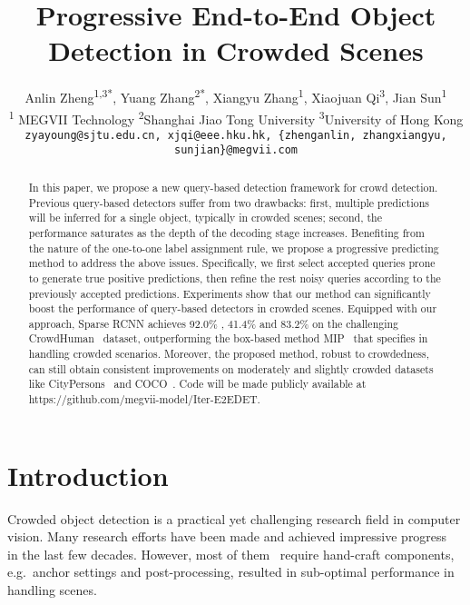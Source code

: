\documentclass[final]{cvpr}
\author{\Large 
Anlin Zheng\textsuperscript{\rm 1,3*},
Yuang Zhang\textsuperscript{\rm 2*},
Xiangyu Zhang\textsuperscript{\rm 1},
Xiaojuan Qi\textsuperscript{\rm 3},
Jian Sun\textsuperscript{\rm 1}\\
\textsuperscript{\rm 1} MEGVII Technology \quad
\textsuperscript{\rm 2}Shanghai Jiao Tong University\quad
\textsuperscript{\rm 3}{University of Hong Kong}
\\
\texttt{\small zyayoung@sjtu.edu.cn, xjqi@eee.hku.hk, \{zhenganlin, zhangxiangyu, sunjian\}@megvii.com}\\
}
\begin{document}
\title{Progressive End-to-End Object Detection in Crowded Scenes}




\maketitle

{\let\thefootnote\relax{}}


\begin{abstract}
In this paper, we propose a new query-based detection framework for crowd detection. Previous query-based detectors suffer from two drawbacks: first, multiple predictions will be inferred for a single object, typically in crowded scenes; second, the performance saturates as the depth of the decoding stage increases. Benefiting from the nature of the one-to-one label assignment rule, we propose a progressive predicting method to address the above issues. Specifically, we first select accepted queries prone to generate true positive predictions, then refine the rest noisy queries according to the previously accepted predictions. Experiments show that our method can significantly boost the performance of query-based detectors in crowded scenes. Equipped with our approach, Sparse RCNN achieves 92.0\% , 41.4\%  and 83.2\%  on the challenging CrowdHuman~\cite{shao2018crowdhuman} dataset, outperforming the box-based method MIP~\cite{chu2020detection} that specifies in handling crowded scenarios. Moreover, the proposed method, robust to crowdedness, can still obtain consistent improvements on moderately and slightly crowded datasets like CityPersons~\cite{zhang2017citypersons} and COCO~\cite{lin2014microsoft}. Code will be made publicly available at https://github.com/megvii-model/Iter-E2EDET.







\vspace{-2pt}
\end{abstract}

\section{Introduction}\label{intro}
Crowded object detection is a practical yet challenging research field in computer vision. Many research efforts have been made and achieved impressive progress ~\cite{lu2019semantic, chi2020pedhunter, chi2020relational,zhang2019double,zhang2018occlusion,chu2020detection,iterdet2021,psrcnn,lin2020detr} in the last few decades. However, most of them~\cite{lu2019semantic, chi2020pedhunter, chi2020relational,zhang2019double,zhang2018occlusion,chu2020detection,iterdet2021,psrcnn} require hand-craft components, e.g.\ anchor settings and post-processing, resulted in sub-optimal performance in handling scenes.
\end{document}

